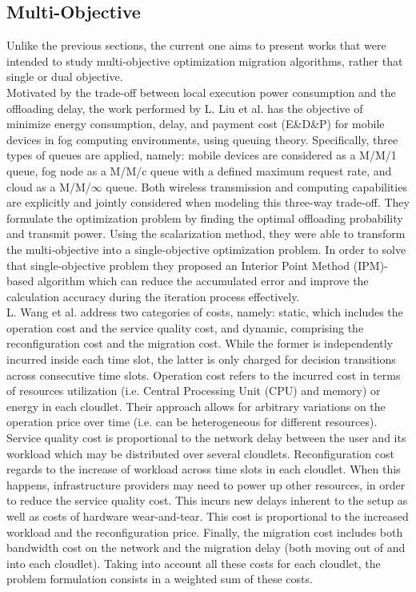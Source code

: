 \subsection{Multi-Objective}\label{sec:multi}
Unlike the previous sections, the current one aims to present works that were intended to study multi-objective optimization migration algorithms, rather that single or dual objective.\\
\noindent\tab Motivated by the trade-off between local execution power consumption and the offloading delay, the work performed by L. Liu et al. \cite{liu2018multiobjective} has the objective of minimize energy consumption, delay, and payment cost (E\&D\&P) for mobile devices in fog computing environments, using queuing theory. Specifically, three types of queues are applied, namely: mobile devices are considered as a M/M/1 queue, fog node as a M/M/c queue with a defined maximum request rate, and cloud as a M/M/$\infty$ queue. Both wireless transmission and computing capabilities are explicitly and jointly considered when modeling this three-way trade-off. They formulate the optimization problem by finding the optimal offloading probability and transmit power. Using the scalarization method, they were able to transform the multi-objective into a single-objective optimization problem. In order to solve that single-objective problem they proposed an Interior Point Method (IPM)-based algorithm which can reduce the accumulated error and improve the calculation accuracy during the iteration process effectively.\\
\noindent\tab L. Wang \cite{wang2018moera} et al. address two categories of costs, namely: static, which includes the operation cost and the service quality cost, and dynamic, comprising the reconfiguration cost and the migration cost. While the former is independently incurred inside each time slot, the latter is only charged for decision transitions across consecutive time slots. Operation cost refers to the incurred cost in terms of resources utilization (i.e. Central Processing Unit (CPU) and memory) or energy in each cloudlet. Their approach allows for arbitrary variations on the operation price over time (i.e. can be heterogeneous for different resources). Service quality cost is proportional to the network delay between the user and its workload which may be distributed over several cloudlets. Reconfiguration cost regards to the increase of workload across time slots in each cloudlet. When this happens, infrastructure providers may need to power up other resources, in order to reduce the service quality cost. This incurs new delays inherent to the setup as well as costs of hardware wear-and-tear. This cost is proportional to the increased workload and the reconfiguration price. Finally, the migration cost includes both bandwidth cost on the network and the migration delay (both moving out of and into each cloudlet). Taking into account all these costs for each cloudlet, the problem formulation consists in a weighted sum of these costs. 

